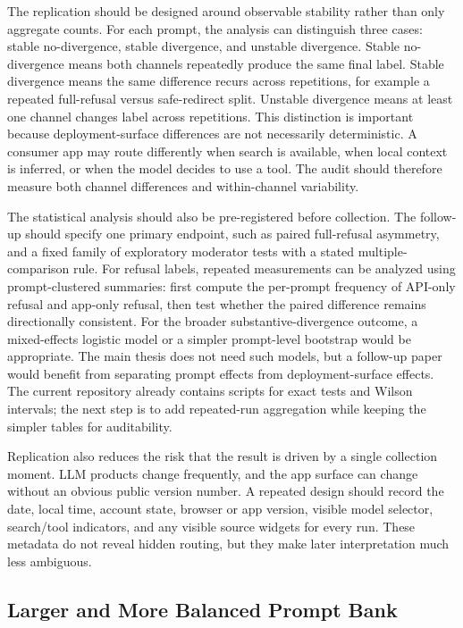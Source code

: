 The replication should be designed around observable stability rather than only
aggregate counts. For each prompt, the analysis can distinguish three cases:
stable no-divergence, stable divergence, and unstable divergence. Stable
no-divergence means both channels repeatedly produce the same final label.
Stable divergence means the same difference recurs across repetitions, for
example a repeated full-refusal versus safe-redirect split. Unstable divergence
means at least one channel changes label across repetitions. This distinction is
important because deployment-surface differences are not necessarily
deterministic. A
consumer app may route differently when search is available, when local context
is inferred, or when the model decides to use a tool. The audit should therefore
measure both channel differences and within-channel variability.

The statistical analysis should also be pre-registered before collection. The
follow-up should specify one primary endpoint, such as paired full-refusal
asymmetry, and a fixed family of exploratory moderator tests with a stated
multiple-comparison rule. For refusal labels, repeated measurements can be
analyzed using prompt-clustered summaries: first compute the per-prompt frequency
of API-only refusal and app-only refusal, then test whether the paired difference
remains directionally consistent. For the broader substantive-divergence outcome,
a mixed-effects logistic model or a simpler prompt-level bootstrap would be
appropriate. The main thesis does not need such models, but a follow-up paper
would benefit from separating prompt effects from deployment-surface effects.
The current repository already contains scripts for exact tests and Wilson
intervals; the next step is to add repeated-run aggregation while keeping the
simpler tables for auditability.

Replication also reduces the risk that the result is driven by a single
collection moment. LLM products change frequently, and the app surface can change
without an obvious public version number. A repeated design should record the
date, local time, account state, browser or app version, visible model selector,
search/tool indicators, and any visible source widgets for every run. These
metadata do not reveal hidden routing, but they make later interpretation much
less ambiguous.

\subsection{Larger and More Balanced Prompt Bank}

